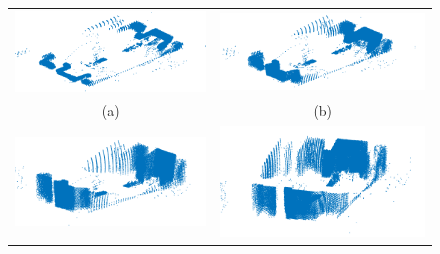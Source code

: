 \begin{figure}%
    \centering
    \begin{tabular}{cc}
      \includegraphics[width=.52\textwidth]{images/pasadizo_8.png}&
      \includegraphics[width=.52\textwidth]{images/pasadizo_7.png}\\
      (a)&(b)\\
      \includegraphics[width=.52\textwidth]{images/pasadizo_6.png}&
      \includegraphics[width=.52\textwidth]{images/pasadizo_5.png}\\

\end{tabular}
\end{figure}
